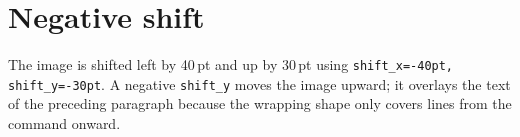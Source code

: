 \documentclass{article}
\begin{document}
\section*{Negative shift}

The image is shifted left by 40\,pt and up by 30\,pt using
\texttt{shift\_x=-40pt, shift\_y=-30pt}.  A negative \texttt{shift\_y} moves the
image upward; it overlays the text of the preceding paragraph because the
wrapping shape only covers lines from the \texttt{\string\wrapgraphics}
command onward.

\lipsum[1-10]
\end{document}
